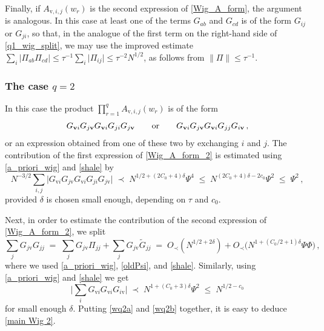 \documentclass[11pt]{article} %
\numberwithin{equation}{section}
\numberwithin{figure}{section}
\theoremstyle{plain} %
\theoremstyle{definition} %
\newcommand{\f}[1]{\boldsymbol{\mathrm{#1}}} %
\newcommand{\wt}{\widetilde}
\newcommand{\txt}[1]{\text{\rm{#1}}}
\renewcommand{\leq}{\leqslant}
\newcommand{\pb}[1]{\bigl({#1}\bigr)}
\newcommand{\abs}[1]{\lvert #1 \rvert}
\newcommand{\absb}[1]{\bigl\lvert #1 \bigr\rvert}
\newcommand{\absbb}[1]{\biggl\lvert #1 \biggr\rvert}
\newcommand{\norm}[1]{\lVert #1 \rVert}
\begin{document}
Finally, if $A_{\f v,i,j }(w_r)$ is the second expression of \eqref{Wig_A_form}, the argument is analogous. In this case at least one of the terms $G_{ab}$ and $G_{cd}$ is of the form $G_{ij}$ or $G_{ji}$, so that, in the analogue of the first term on the right-hand side of \eqref{q1_wig_split}, we may use the improved estimate $\sum_{i} \abs{\Pi_{ab} \Pi_{cd}} \leq \tau^{-1} \sum_i \abs{\Pi_{ij}}\leq \tau^{-2} N^{1/2}$, as follows from $\norm{\Pi} \leq \tau^{-1}$.

\subsubsection*{The case $q = 2$}
In this case the product $\prod_{r = 1}^{q} A_{\f v,i,j }(w_r)$ is of the form
\begin{equation} \label{Wig_A_form_2}
G_{\f v i} G_{j \f v} G_{\f v i}  G_{ji}G_{j \f v} \qquad \txt{or} \qquad  G_{\f v i}G_{j \f v} G_{\f v i}  G_{jj} G_{i \f v}\,,
\end{equation}
or an expression obtained from one of these two by exchanging $i$ and $j$. The contribution of the first expression of \eqref{Wig_A_form_2} is estimated using \eqref{a_priori_wig} and \eqref{shale} by
\begin{equation*}
N^{-3/2} \sum_{i,j} \absb{G_{\f v i}G_{j \f v} G_{\f v i}  G_{ji}G_{j \f v}} \;\prec\; N^{1/2 + (2 C_0 + 4) \delta} \Psi^4 \;\leq\; N^{(2 C_0 + 4) \delta - 2 c_0} \Psi^2 \;\leq\; \Psi^2\,,
\end{equation*}
provided $\delta$ is chosen small enough, depending on $\tau$ and $c_0$.

Next, in order to estimate the contribution of the second expression of \eqref{Wig_A_form_2}, we split
\begin{equation} \label{wq2a}
\sum_jG_{j \f v} G_{jj} \;=\; \sum_jG_{j \f v}\Pi_{jj} + \sum_jG_{j \f v}\wt G_{jj}
 \;=\; O_\prec(N^{1/2+2\delta})+O_\prec \pb{N^{1+(C_0 / 2 + 1) \delta} \Psi \Phi}\,,
\end{equation}
where we used \eqref{a_priori_wig}, \eqref{oldPsi}, and \eqref{shale}. Similarly, using \eqref{a_priori_wig} and \eqref{shale} we get
\begin{equation} \label{wq2b}
\absbb{\sum_i G_{\f v i}  G_{\f v i}G_{i \f v}} \;\prec\; N^{1 + (C_0 + 3) \delta} \Psi^2 \;\leq\; N^{1/2 - c_0}
\end{equation}
for small enough $\delta$. Putting \eqref{wq2a} and \eqref{wq2b} together, it is easy to deduce \eqref{main Wig 2}.
 
\end{document}
